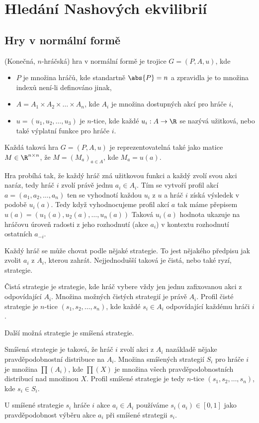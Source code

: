 \section{Hledání Nashových ekvilibrií}
\subsection{Hry v normální formě}
\begin{definition}
\label{def:normal_form_game}
(Konečná, $n$-hráčská) hra v normální formě je trojice $G = (P, A, u)$, kde 
\begin{itemize}
    \item $P$ je množina hráčů, kde standartně $\abs{P} = n$ a zpravidla je to množina indexů není-li definováno jinak,
    \item $A = A_1 \times A_2 \times \dots \times A_n$, kde $A_i$ je množina dostupných akcí pro hráče $i$,\item $u = (u_1, u_2, \dots, u_3)$ je $n$-tice, kde každé $u_i: A \rightarrow \R$ se nazývá užitková, nebo také výplatní funkce pro hráče $i$.
\end{itemize}
Každá taková hra $G = (P,A,u)$ je reprezentovatelná také jako matice $M \in \R^{n \times n}$, že $M = (M_a)_{a\in A}$, kde $M_a = u(a)$.
\end{definition}
Hra probíhá tak, že každý hráč zná užitkovou funkci a každý zvolí svou akci naráz, tedy hráč $i$ zvolí právě jednu $a_i \in A_i$. 
Tím se vytvoří profil akcí $a = (a_1, a_2, \dots, a_n)$ ten se vyhodnotí každou $u_i$ z $u$ a hráč $i$ získá výsledek v podobě $u_i(a)$. 
Tedy když vyhodnocujeme profil akcí $a$ tak máme přepisem $u(a) = (u_1(a), u_2(a), \dots, u_n(a))$
Taková $u_i(a)$ hodnota ukazuje na hráčovu úroveň radosti z jeho rozhodnutí (akce $a_i$) v kontextu rozhodnutí ostatních $a_{-i}$. 

Každý hráč se může chovat podle nějaké strategie. To jest nějakého předpisu jak zvolit $a_i$ z $A_i$, kterou zahrát. Nejjednodušší taková je čistá, nebo také ryzí, strategie.
\begin{definition}
\label{def:pure_strategy}
Čistá strategie je strategie, kde hráč vybere vždy jen jednu zafixovanou akci z odpovídající $A_i$. Množina možných čistých strategií je právě $A_i$. Profil čisté strategie je $n$-tice $(s_1, s_2, \dots, s_n)$, kde každé $s_i \in A_i$ odpovídající každému hráči $i$.
\end{definition}
Další možná strategie je smíšená strategie. 
\begin{definition}
\label{def:mixed_strategy}
Smíšená strategie je taková, že hráč $i$ zvolí akci z $A_i$ nazákladě nějake pravděpodobnostní distribuce na $A_i$. Množina smíšených strategií $S_i$ pro hráče $i$ je množina $\prod (A_i)$, kde $\prod(X)$ je množina všech pravděpodobnostních distribucí nad množinou $X$. Profil smíšené strategie je tedy $n$-tice $(s_1, s_2, \dots, s_n)$, kde $s_i \in S_i$. 
\end{definition}
U smíšené strategie $s_i$ hráče $i$ akce $a_i \in A_i$ používáme $s_i(a_i) \in [0,1]$ jako pravděpodobnost výběru akce $a_i$ při smíšené strategii $s_i$. 

